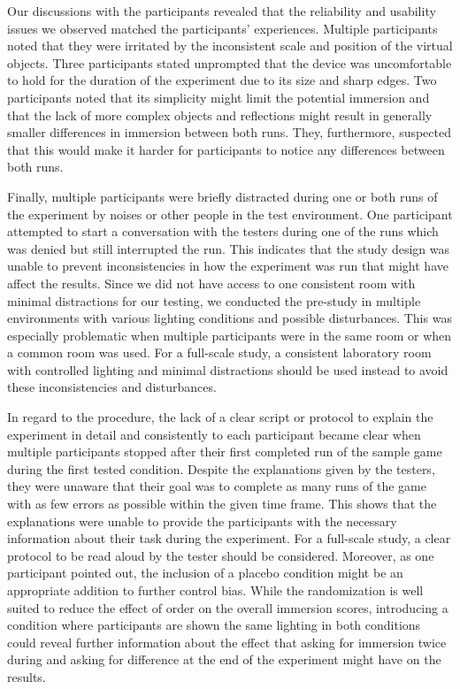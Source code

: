 \documentclass[12pt,twoside,english]{article}
\begin{document}
Our discussions with the participants revealed that the reliability and usability issues we observed matched the participants' experiences.
Multiple participants noted that they were irritated by the inconsistent scale and position of the virtual objects.
Three participants stated unprompted that the device was uncomfortable to hold for the duration of the experiment due to its size and sharp edges.
Two participants noted that its simplicity might limit the potential immersion and that the lack of more complex objects and reflections might result in generally smaller differences in immersion between both runs.
They, furthermore, suspected that this would make it harder for participants to notice any differences between both runs.

Finally, multiple participants were briefly distracted during one or both runs of the experiment by noises or other people in the test environment.
One participant attempted to start a conversation with the testers during one of the runs which was denied but still interrupted the run.
This indicates that the study design was unable to prevent inconsistencies in how the experiment was run that might have affect the results.
Since we did not have access to one consistent room with minimal distractions for our testing, we conducted the pre-study in multiple environments with various lighting conditions and possible disturbances.
This was especially problematic when multiple participants were in the same room or when a common room was used.
For a full-scale study, a consistent laboratory room with controlled lighting and minimal distractions should be used instead to avoid these inconsistencies and disturbances.

In regard to the procedure, the lack of a clear script or protocol to explain the experiment in detail and consistently to each participant became clear when multiple participants stopped after their first completed run of the sample game during the first tested condition.
Despite the explanations given by the testers, they were unaware that their goal was to complete as many runs of the game with as few errors as possible within the given time frame.
This shows that the explanations were unable to provide the participants with the necessary information about their task during the experiment.
For a full-scale study, a clear protocol to be read aloud by the tester should be considered.
Moreover, as one participant pointed out, the inclusion of a placebo condition might be an appropriate addition to further control bias.
While the randomization is well suited to reduce the effect of order on the overall immersion scores, introducing a condition where participants are shown the same lighting in both conditions could reveal further information about the effect that asking for immersion twice during and asking for difference at the end of the experiment might have on the results.
\end{document}
